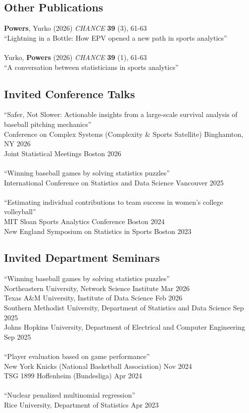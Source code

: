 \documentclass{article}
\begin{document}
\subsection*{\sc Other Publications}

\textbf{Powers}, Yurko (2026) \textit{CHANCE} \textbf{39} (3), 61-63\\
``Lightning in a Bottle: How EPV opened a new path in sports analytics''\\
~\\
Yurko, \textbf{Powers} (2026) \textit{CHANCE} \textbf{39} (1), 61-63\\
``A conversation between statisticians in sports analytics''

\subsection*{\sc Invited Conference Talks}

``Safer, Not Slower: Actionable insights from a large-scale survival analysis of baseball pitching mechanics''\\
Conference on Complex Systems (Complexity \& Sports Satellite) \hfill Binghamton, NY 2026\\
Joint Statistical Meetings \hfill Boston 2026\\
~\\
``Winning baseball games by solving statistics puzzles''\\
International Conference on Statistics and Data Science \hfill Vancouver 2025\\
~\\
``Estimating individual contributions to team success in women's college volleyball''\\
MIT Sloan Sports Analytics Conference \hfill Boston 2024\\
New England Symposium on Statistics in Sports \hfill Boston 2023

\subsection*{\sc Invited Department Seminars}

``Winning baseball games by solving statistics puzzles''\\
Northeastern University, Network Science Institute \hfill Mar 2026\\
Texas A\&M University, Institute of Data Science \hfill Feb 2026\\
Southern Methodist University, Department of Statistics and Data Science \hfill Sep 2025\\
Johns Hopkins University, Department of Electrical and Computer Engineering \hfill Sep 2025\\
~\\
``Player evaluation based on game performance''\\
New York Knicks (National Basketball Association) \hfill Nov 2024\\
TSG 1899 Hoffenheim (Bundesliga) \hfill Apr 2024\\
~\\
``Nuclear penalized multinomial regression''\\
Rice University, Department of Statistics \hfill Apr 2023
\end{document}
